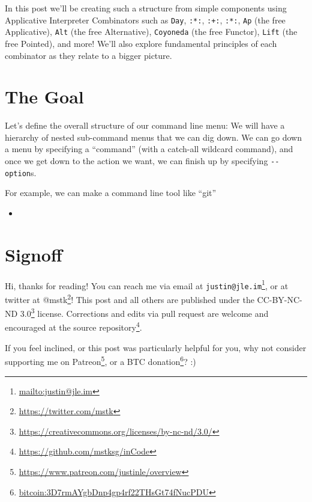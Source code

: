 \documentclass[]{article}
\renewcommand{\href}[2]{#2\footnote{\url{#1}}}
\begin{document}
In this post we'll be creating such a structure from simple components using
Applicative Interpreter Combinators such as \texttt{Day}, \texttt{:*:},
\texttt{:+:}, \texttt{:*:}, \texttt{Ap} (the free Applicative), \texttt{Alt}
(the free Alternative), \texttt{Coyoneda} (the free Functor), \texttt{Lift} (the
free Pointed), and more! We'll also explore fundamental principles of each
combinator as they relate to a bigger picture.

\hypertarget{the-goal}{%
\section{The Goal}\label{the-goal}}

Let's define the overall structure of our command line menu: We will have a
hierarchy of nested sub-command menus that we can dig down. We can go down a
menu by specifying a ``command'' (with a catch-all wildcard command), and once
we get down to the action we want, we can finish up by specifying
\texttt{-\/-option}s.

For example, we can make a command line tool like ``git''

\begin{itemize}
\item
\end{itemize}

\hypertarget{signoff}{%
\section{Signoff}\label{signoff}}

Hi, thanks for reading! You can reach me via email at
\href{mailto:justin@jle.im}{\nolinkurl{justin@jle.im}}, or at twitter at
\href{https://twitter.com/mstk}{@mstk}! This post and all others are published
under the \href{https://creativecommons.org/licenses/by-nc-nd/3.0/}{CC-BY-NC-ND
3.0} license. Corrections and edits via pull request are welcome and encouraged
at \href{https://github.com/mstksg/inCode}{the source repository}.

If you feel inclined, or this post was particularly helpful for you, why not
consider \href{https://www.patreon.com/justinle/overview}{supporting me on
Patreon}, or a \href{bitcoin:3D7rmAYgbDnp4gp4rf22THsGt74fNucPDU}{BTC donation}?
:)
\end{document}

